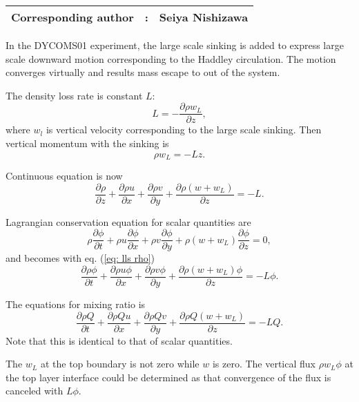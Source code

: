 {\bf \Large 
\begin{tabular}{ccc}
\hline
  Corresponding author & : & Seiya Nishizawa\\
\hline
\end{tabular}
}


In the DYCOMS01 experiment, the large scale sinking is added
to express large scale downward motion corresponding to the Haddley circulation.
The motion converges virtually and results mass escape to out of the system.

The density loss rate is constant $L$:
\begin{equation}
  L = -\frac{\partial \rho w_L}{\partial z},
\end{equation}
where $w_l$ is vertical velocity corresponding to the large scale sinking.
Then vertical momentum with the sinking is
\begin{equation}
  \rho w_L = -Lz.
\end{equation}

Continuous equation is now
\begin{equation}
  \frac{\partial \rho}{\partial z}
  + \frac{\partial \rho u}{\partial x}
  + \frac{\partial \rho v}{\partial y}
  + \frac{\partial \rho (w+w_L)}{\partial z}
  = -L.
  \label{eq: lls rho}
\end{equation}

Lagrangian conservation equation for scalar quantities are
\begin{equation}
  \rho\frac{\partial \phi}{\partial t}
  + \rho u\frac{\partial \phi}{\partial x}
  + \rho v\frac{\partial \phi}{\partial y}
  + \rho (w+w_L)\frac{\partial \phi}{\partial z}
  = 0,
\end{equation}
and becomes with eq. (\ref{eq: lls rho})
\begin{equation}
  \frac{\partial \rho\phi}{\partial t}
  + \frac{\partial \rho u \phi}{\partial x}
  + \frac{\partial \rho v \phi}{\partial y}
  + \frac{\partial \rho (w+w_L) \phi}{\partial z}
  = -L\phi.
\end{equation}

The equations for mixing ratio is
\begin{equation}
  \frac{\partial \rho Q}{\partial t}
  + \frac{\partial \rho Q u }{\partial x}
  + \frac{\partial \rho Q v}{\partial y}
  + \frac{\partial \rho Q (w+w_L)}{\partial z}
  = -L Q.
\end{equation}
Note that this is identical to that of scalar quantities.

The $w_L$ at the top boundary is not zero while $w$ is zero.
The vertical flux $\rho w_L \phi$ at the top layer interface could be determined as
that convergence of the flux is canceled with $L\phi$.


